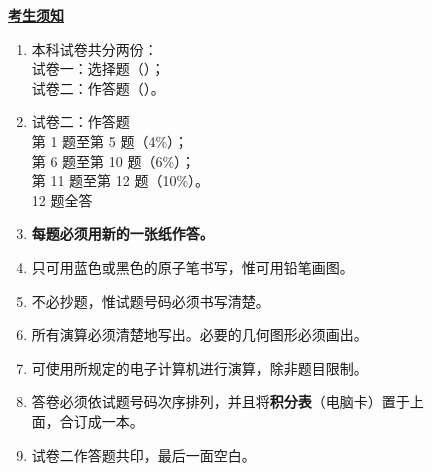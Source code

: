 \documentclass[12pt,a4paper]{exam-zh}
\begin{document}
    {\bfseries \underline{考生须知}\par}
    \vspace{0.3em}

    {
    \begin{enumerate}[label=（\chinese*）,leftmargin=3em,itemsep=0.25em,topsep=0.3em,parsep=0pt,partopsep=0pt]
    \item 本科试卷共分两份：\\
    \hspace*{2em}试卷一：选择题（\paperonepercentage）；\\
    \hspace*{2em}试卷二：作答题（\papertwopercentage）。

    \item 试卷二：作答题 \\
        \hspace*{2em}第 1 题至第 5 题（4\%）；\\
        \hspace*{2em}第 6 题至第 10 题（6\%）；\\
        \hspace*{2em}第 11 题至第 12 题（10\%）。\\
        \hspace*{2em}12 题全答

  \item \textbf{每题必须用新的一张纸作答。}

  \item 只可用蓝色或黑色的原子笔书写，惟可用铅笔画图。

  \item 不必抄题，惟试题号码必须书写清楚。

  \item 所有演算必须清楚地写出。必要的几何图形必须画出。

  \item 可使用所规定的电子计算机进行演算，除非题目限制。

  \item 答卷必须依试题号码次序排列，并且将\textbf{积分表}（电脑卡）置于上\\
  面，合订成一本。

  \item 试卷二作答题共印\questionpages，最后一面空白。
    \end{enumerate}
    }

    \vspace{0.5em}

    \begin{center}
    {%
    \setlength{\fboxrule}{3pt}%
    \setlength{\fboxsep}{1.5pt}%
    }
    \end{center}
\end{document}
